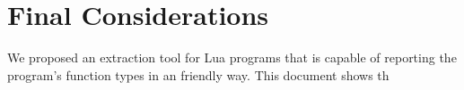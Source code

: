 \chapter{Final Considerations}
\label{cha:Final Considerations}
We proposed an extraction tool for Lua programs that is capable of reporting the program's function types in an friendly way. This document shows th

% 